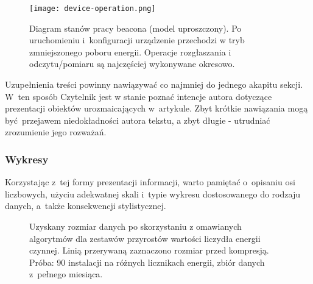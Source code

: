 \begin{figure}
	\begin{center}
		\vspace{-5mm}
		\texttt{[image: device-operation.png]}
		\caption{
			Diagram stanów pracy beacona (model uproszczony). Po uruchomieniu i~konfiguracji urządzenie przechodzi w tryb zmniejszonego poboru energii. Operacje rozgłaszania i odczytu/pomiaru są najczęściej wykonywane okresowo.
		}
		\label{fig:devop}
		\vspace{-8mm}
	\end{center}
\end{figure}

\noindent Uzupełnienia treści powinny nawiązywać co najmniej do jednego akapitu sekcji. W~ten sposób Czytelnik jest w stanie poznać intencje autora dotyczące prezentacji obiektów urozmaicających w~artykule. Zbyt krótkie nawiązania mogą być przejawem niedokładności autora tekstu, a zbyt długie - utrudniać zrozumienie jego rozważań.

\subsubsection{Wykresy}
\label{subsubsec:charts}

Korzystając z~tej formy prezentacji informacji, warto pamiętać o~opisaniu osi liczbowych, użyciu adekwatnej skali i~typie wykresu dostosowanego do rodzaju danych, a~także konsekwencji stylistycznej.

\begin{figure}[!h]
	\vspace{-3mm}
	\centering
	\caption{
		Uzyskany rozmiar danych po skorzystaniu z omawianych algorytmów dla zestawów przyrostów wartości liczydła energii czynnej. Linią przerywaną zaznaczono rozmiar przed kompresją. Próba: 90 instalacji na różnych licznikach energii, zbiór danych z~pełnego miesiąca.
	}
	\vspace{-6mm}
	\label{fig:compressionAlgorithms}
\end{figure}

